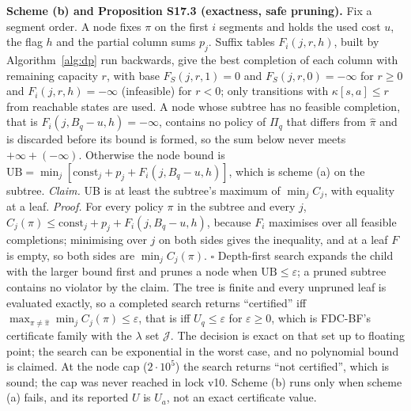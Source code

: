 \documentclass[sigconf,anonymous,review]{acmart}
\newcommand{\eps}{\varepsilon}
\begin{document}
\textbf{Scheme (b) and Proposition S17.3 (exactness, safe pruning).} Fix a segment order. A node fixes $\pi$ on the first $i$ segments and holds the used cost $u$, the flag $h$ and the partial column sums $p_j$. Suffix tables $F_i(j, r, h)$, built by Algorithm~\ref{alg:dp} run backwards, give the best completion of each column with remaining capacity $r$, with base $F_S(j, r, 1) = 0$ and $F_S(j, r, 0) = -\infty$ for $r \ge 0$ and $F_i(j, r, h) = -\infty$ (infeasible) for $r < 0$; only transitions with $\kappa[s,a] \le r$ from reachable states are used. A node whose subtree has no feasible completion, that is $F_i(j, B_q - u, h) = -\infty$, contains no policy of $\Pi_q$ that differs from $\hat\pi$ and is discarded before its bound is formed, so the sum below never meets $+\infty + (-\infty)$. Otherwise the node bound is $\mathrm{UB} = \min_j [\mathrm{const}_j + p_j + F_i(j, B_q - u, h)]$, which is scheme (a) on the subtree. \emph{Claim.} UB is at least the subtree's maximum of $\min_j C_j$, with equality at a leaf. \emph{Proof.} For every policy $\pi$ in the subtree and every $j$, $C_j(\pi) \le \mathrm{const}_j + p_j + F_i(j, B_q - u, h)$, because $F_i$ maximises over all feasible completions; minimising over $j$ on both sides gives the inequality, and at a leaf $F$ is empty, so both sides are $\min_j C_j(\pi)$. $\square$ Depth-first search expands the child with the larger bound first and prunes a node when $\mathrm{UB} \le \eps$; a pruned subtree contains no violator by the claim. The tree is finite and every unpruned leaf is evaluated exactly, so a completed search returns ``certified'' iff $\max_{\pi\ne\hat\pi} \min_j C_j(\pi) \le \eps$, that is iff $U_q \le \eps$ for $\eps \ge 0$, which is FDC-BF's certificate family with the $\lambda$ set $\mathcal{J}$. The decision is exact on that set up to floating point; the search can be exponential in the worst case, and no polynomial bound is claimed. At the node cap ($2 \cdot 10^5$) the search returns ``not certified'', which is sound; the cap was never reached in lock v10. Scheme (b) runs only when scheme (a) fails, and its reported $U$ is $U_a$, not an exact certificate value.
\end{document}
